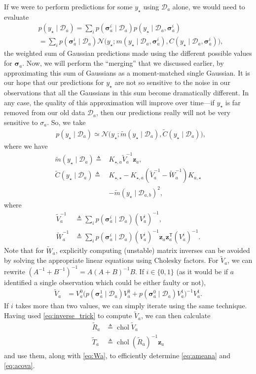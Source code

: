 \documentclass{article}
\newcommand{\given}{\ensuremath{\mid}}
\newcommand{\cm}[1]{\ensuremath{\mathcal{#1}}}
\newcommand{\bm}[1]{\ensuremath{\mathbf{#1}}}
\newcommand{\data}{\ensuremath{\cm{D}}}
\newcommand{\vect}[1]{\bm{#1}}
\newcommand{\vz}{\vect{z}}
\newcommand{\vs}{\vect{\sigma}}
\newcommand{\amean}[2]{\tilde{{m}}(#1 \given #2 )}
\newcommand{\acov}[2]{\tilde{{C}}(#1 \given #2 )}
\newcommand{\p}[2]{p(#1 \given #2 )}
\newcommand{\fPr}{p}
\newcommand{\Prob}[2]{\fPr(#1 \given #2 )}
\newcommand{\mean}[2]{{m}(#1 \given #2 )}
\newcommand{\cov}[2]{{C}(#1 \given #2 )}
\newcommand{\st}{_{\star}}
\newcommand{\tr}{\ensuremath{\mathsf{T}}}
\newcommand{\defequal}{\triangleq}
\DeclareMathOperator{\chol}{chol}
\begin{document}
If we were to perform predictions for some $y\st$ using $\data_a$
alone, we would need to evaluate
\begin{align*}
&\p{y\st}{\data_{a}} = \sum_{i} \Prob{\vs^i_{a}}{\data_a} \p{y\st}{\data_a, \vs^{i}_{a}}\nonumber\\
&=\sum_{i} \Prob{\vs^i_{a}}{\data_a} \cm{N}\bigl(y\st; \mean{y\st}{\data_a, \vs^{i}_{a}}, \cov{y\st}{\data_a, \vs^{i}_{a}}\bigr),
\end{align*}
the weighted sum of Gaussian predictions made using the different
possible values for $\vs_{a}$.  Now, we will perform the ``merging''
that we discussed earlier, by approximating this sum of Gaussians as a
moment-matched single Gaussian. It is our hope that our predictions
for $y\st$ are not so sensitive to the noise in our observations that
all the Gaussians in this sum become dramatically different. In any
case, the quality of this approximation will improve over time---if
$y\st$ is far removed from our old data $\data_a$, then our
predictions really will not be very sensitive to $\sigma_a$. So, we take
\begin{align*}
 &\p{y\st}{\data_{a}} \simeq \cm{N}\bigl(y\st; \amean{y\st}{\data_a}, \acov{y\st}{\data_a}\bigr),%
\end{align*}
where we have
\begin{align}
\amean{y\st}{\data_{a}} \defequal {}& K_{\star,a} \tilde{V}_a^{-1} \vz_a,\label{eq:ameana}\\
\acov{y\st}{\data_{a}}
\defequal {}& K_{\star,\star} - K_{\star,a}(\tilde{V}_a^{-1}-\tilde{W}_a^{-1})K_{a,\star} 
\nonumber\\
& - \amean{y\st}{\data_{a,b}}^2 ,\label{eq:acova}
\end{align}
where
\begin{align}
 \tilde{V}_a^{-1}  & \defequal \sum_i \Prob{\vs^i_{a}}{\data_a} (V_a^i)^{-1},\nonumber\\
 \tilde{W}_a^{-1} & \defequal \sum_i \Prob{\vs^i_{a}}{\data_a} (V_a^i)^{-1}\vz_a \vz_a^\tr (V_a^i)^{-1}.\label{eq:Wa}
\end{align}
Note that for $\tilde{W}_a$, explicitly computing (unstable) matrix
inverses can be avoided by solving the appropriate linear equations
using Cholesky factors.  For $\tilde{V}_a$, we can rewrite
$(A^{-1}+B^{-1})^{-1} = A (A+B)^{-1} B$. If $i\in\{0,1\}$ (as it would
be if $a$ identified a single observation which could be either faulty
or not),
\begin{align} \label{eq:inverse_trick}
\tilde{V}_a & = V^0_a\bigl(
\Prob{\vs^1_{a}}{\data_a} V^0_a 
+ 
\Prob{\vs^0_{a}}{\data_a} V^1_a
\bigr)^{-1}V^1_a.
\end{align}
If $i$ takes more than two values, we can simply iterate using the
same technique. Having used \eqref{eq:inverse_trick} to compute
$\tilde{V}_a$, we can then calculate
\begin{align*}
 \tilde{R}_a & \defequal \chol \tilde{V}_a \\%
 \tilde{T}_a & \defequal \chol (\tilde{R}_a)^{-1} \vz_a %
\end{align*}
and use them, along with \eqref{eq:Wa}, to efficiently determine
\eqref{eq:ameana} and \eqref{eq:acova}.
\end{document}
